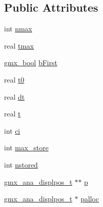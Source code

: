 \subsection*{\-Public \-Attributes}
\begin{DoxyCompactItemize}
\item 
int \hyperlink{structgmx__ana__displ__t_a9e7bad0a0b5b581f71d3f4ec2482ce9c}{nmax}
\item 
real \hyperlink{structgmx__ana__displ__t_ab42175925fe93a32a03976b41025c5ac}{tmax}
\item 
\hyperlink{include_2types_2simple_8h_a8fddad319f226e856400d190198d5151}{gmx\-\_\-bool} \hyperlink{structgmx__ana__displ__t_abdd1c7845e00a75c75d97765a602c984}{b\-First}
\item 
real \hyperlink{structgmx__ana__displ__t_aa1dd896329d174325fef6b195e8daa0c}{t0}
\item 
real \hyperlink{structgmx__ana__displ__t_ae064c1c3553ab6976a5918c261dbdd19}{dt}
\item 
real \hyperlink{structgmx__ana__displ__t_acd1f438af53130abc117725260ec7582}{t}
\item 
int \hyperlink{structgmx__ana__displ__t_a41747bd4bed296a4811811a8e5e576da}{ci}
\item 
int \hyperlink{structgmx__ana__displ__t_adfa23f16e006650eca65638b279629f5}{max\-\_\-store}
\item 
int \hyperlink{structgmx__ana__displ__t_a0efe5ca7513a08868925634265da677c}{nstored}
\item 
\hyperlink{structgmx__ana__displpos__t}{gmx\-\_\-ana\-\_\-displpos\-\_\-t} $\ast$$\ast$ \hyperlink{structgmx__ana__displ__t_a1d95edacacd5dd34716f64b77f5bdce1}{p}
\item 
\hyperlink{structgmx__ana__displpos__t}{gmx\-\_\-ana\-\_\-displpos\-\_\-t} $\ast$ \hyperlink{structgmx__ana__displ__t_a0efea6583ff758c9657aead87625a1cb}{palloc}
\end{DoxyCompactItemize}


